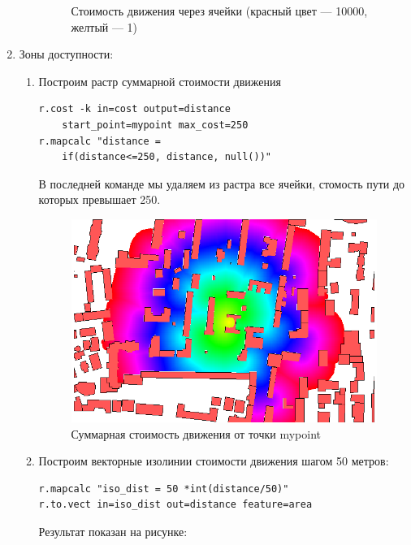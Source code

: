 \begin{frame}
\begin{enumerate}
\begin{enumerate}
\begin{figure}[!ht]
\begin{center}
                \end{center}
                \caption{Стоимость движения через ячейки (красный цвет --- 10000, желтый --- 1)}
            \end{figure}
        \end{enumerate}
        \item Зоны доступности:
        \begin{enumerate}
            \item Построим растр суммарной стоимости движения
            \begin{verbatim}
r.cost -k in=cost output=distance
    start_point=mypoint max_cost=250
r.mapcalc "distance =
    if(distance<=250, distance, null())"
            \end{verbatim}
            В последней команде мы удаляем из растра все ячейки, стомость пути до которых превышает 250.
            \begin{figure}[!ht]
                \begin{center}
                    \includegraphics[width=0.8\columnwidth]{./practic/img/cum_cost}
                \end{center}
                \caption{Суммарная стоимость движения от точки mypoint}
            \end{figure}
            \item Построим векторные изолинии стоимости движения шагом 50 метров:
            \begin{verbatim}
r.mapcalc "iso_dist = 50 *int(distance/50)"
r.to.vect in=iso_dist out=distance feature=area
            \end{verbatim}
            Результат показан на рисунке:
            \begin{figure}[!ht]
                \begin{center}

\end{center}
\end{figure}
\end{enumerate}
\end{enumerate}
\end{frame}
